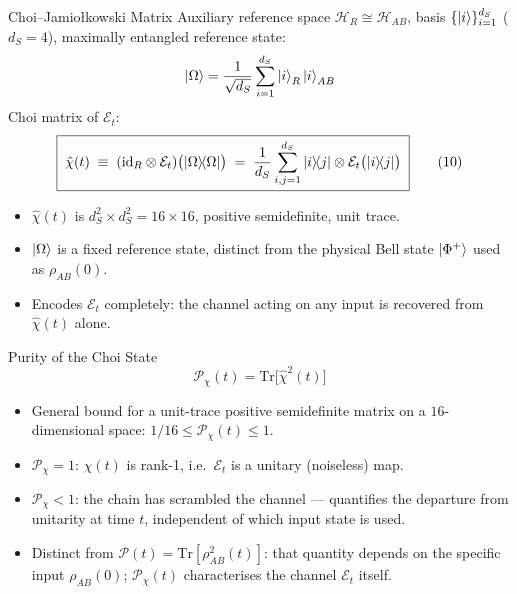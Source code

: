 \documentclass[11pt]{beamer}
\renewcommand{\Tr}{\mathrm{Tr}}
\begin{document}
\begin{frame}{Choi--Jamio{\l}kowski Matrix}
Auxiliary reference space $\mathcal{H}_R\cong\mathcal{H}_{AB}$, basis $\{\ket{i}\}_{i=1}^{d_S}$ ($d_S=4$), maximally entangled reference state:
\[
\ket{\Omega} = \frac{1}{\sqrt{d_S}}\sum_{i=1}^{d_S}\ket{i}_R\ket{i}_{AB}
\]
Choi matrix of $\mathcal{E}_t$:
\[
\boxed{\;\hat\chi(t) \;\equiv\; (\mathrm{id}_R\otimes\mathcal{E}_t)\bigl(\ketbra{\Omega}{\Omega}\bigr) \;=\; \frac{1}{d_S}\sum_{i,j=1}^{d_S}\ketbra{i}{j}\otimes\mathcal{E}_t\bigl(\ketbra{i}{j}\bigr)\;} \tag{10}
\]

\begin{itemize}
\item $\hat\chi(t)$ is $d_S^2\times d_S^2 = 16\times16$, positive semidefinite, unit trace.
\item $\ket{\Omega}$ is a fixed reference state, distinct from the physical Bell state $\ket{\Phi^+}$ used as $\rho_{AB}(0)$.
\item Encodes $\mathcal{E}_t$ completely: the channel acting on any input is recovered from $\hat\chi(t)$ alone.
\end{itemize}
\end{frame}

\begin{frame}{Purity of the Choi State}
\[
\boxed{\;\mathcal{P}_\chi(t) = \Tr\!\bigl[\hat\chi^2(t)\bigr]\;} \tag{11}
\]

\begin{itemize}
\item General bound for a unit-trace positive semidefinite matrix on a $16$-dimensional space: $1/16 \le \mathcal{P}_\chi(t) \le 1$.
\item $\mathcal{P}_\chi = 1$: $\hat\chi(t)$ is rank-1, i.e.\ $\mathcal{E}_t$ is a unitary (noiseless) map.
\item $\mathcal{P}_\chi < 1$: the chain has scrambled the channel — quantifies the departure from unitarity at time $t$, independent of which input state is used.
\item Distinct from $\mathcal{P}(t)=\Tr[\rho_{AB}^2(t)]$: that quantity depends on the specific input $\rho_{AB}(0)$; $\mathcal{P}_\chi(t)$ characterises the channel $\mathcal{E}_t$ itself.
\end{itemize}
\end{frame}
\end{document}
